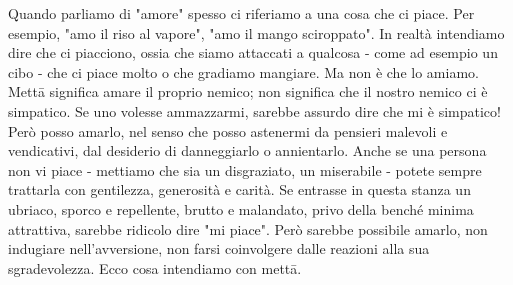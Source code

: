 
Quando parliamo di "amore" spesso ci riferiamo a una cosa che ci piace.
Per esempio, "amo il riso al vapore", "amo il mango sciroppato". In
realtà intendiamo dire che ci piacciono, ossia che siamo attaccati a
qualcosa - come ad esempio un cibo - che ci piace molto o che gradiamo
mangiare. Ma non è che lo amiamo. Mettā significa amare il proprio
nemico; non significa che il nostro nemico ci è simpatico. Se uno
volesse ammazzarmi, sarebbe assurdo dire che mi è simpatico! Però posso
amarlo, nel senso che posso astenermi da pensieri malevoli e
vendicativi, dal desiderio di danneggiarlo o annientarlo. Anche se una
persona non vi piace - mettiamo che sia un disgraziato, un miserabile -
potete sempre trattarla con gentilezza, generosità e carità. Se entrasse
in questa stanza un ubriaco, sporco e repellente, brutto e malandato,
privo della benché minima attrattiva, sarebbe ridicolo dire "mi piace".
Però sarebbe possibile amarlo, non indugiare nell'avversione, non farsi
coinvolgere dalle reazioni alla sua sgradevolezza. Ecco cosa intendiamo
con mettā.

